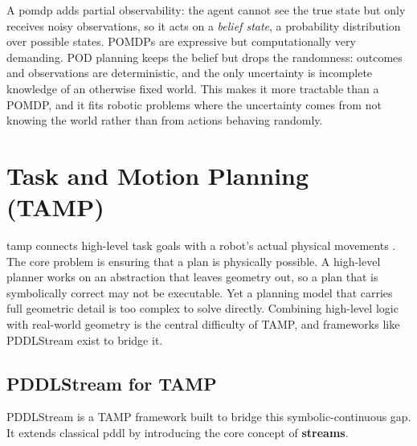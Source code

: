 A \ac{pomdp} \cite{kaelbling1998planning} adds partial observability: the agent cannot see the true state but only receives noisy observations, so it acts on a \emph{belief state}, a probability distribution over possible states. POMDPs are expressive but computationally very demanding. POD planning keeps the belief but drops the randomness: outcomes and observations are deterministic, and the only uncertainty is incomplete knowledge of an otherwise fixed world. This makes it more tractable than a POMDP, and it fits robotic problems where the uncertainty comes from not knowing the world rather than from actions behaving randomly.


\section{Task and Motion Planning (TAMP)}
\label{sec:tamp}
\Ac{tamp} connects high-level task goals with a robot's actual physical movements \cite{garrett2021integrated}. The core problem is ensuring that a plan is physically possible. A high-level planner works on an abstraction that leaves geometry out, so a plan that is symbolically correct may not be executable. Yet a planning model that carries full geometric detail is too complex to solve directly. Combining high-level logic with real-world geometry is the central difficulty of TAMP, and frameworks like PDDLStream exist to bridge it.


\subsection{PDDLStream for TAMP}
PDDLStream \cite{garrett2018pddlstream} is a TAMP framework built to bridge this symbolic-continuous gap. It extends classical \ac{pddl} by introducing the core concept of \textbf{streams}.


